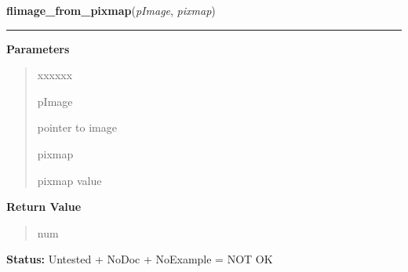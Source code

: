 \hspace{.8\funcindent}\begin{boxedminipage}{\funcwidth}

    \raggedright \textbf{flimage\_from\_pixmap}(\textit{pImage}, \textit{pixmap})

    \vspace{-1.5ex}

    \rule{\textwidth}{0.5\fboxrule}
\setlength{\parskip}{2ex}
\setlength{\parskip}{1ex}
      \textbf{Parameters}
      \vspace{-1ex}

      \begin{quote}
        \begin{Ventry}{xxxxxx}

          \item[pImage]

          pointer to image

          \item[pixmap]

          pixmap value

        \end{Ventry}

      \end{quote}

      \textbf{Return Value}
    \vspace{-1ex}

      \begin{quote}
      num

      \end{quote}

\textbf{Status:} Untested + NoDoc + NoExample = NOT OK



    \end{boxedminipage}

    \label{xformslib:library:flimage_to_pixmap}

    \vspace{0.5ex}

